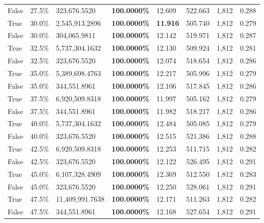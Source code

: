\begin{table}[H]
\begin{tabular}{lllrllll}
\cline{1-8}
False & 27.5\% & 323,676.5520 & \bfseries \color{red} 100.0000\% & 12.609 & 522.663 & 1,812 & 0.288 \\
\cline{1-8}
True & 30.0\% & 2,545,913.2896 & \bfseries \color{red} 100.0000\% & \bfseries \color{red} 11.916 & 505.740 & 1,812 & 0.279 \\
\cline{1-8}
False & 30.0\% & \color{red} 304,065.9811 & \bfseries \color{red} 100.0000\% & 12.142 & 519.971 & 1,812 & 0.287 \\
\cline{1-8}
True & 32.5\% & 5,737,304.1632 & \bfseries \color{red} 100.0000\% & 12.130 & 509.924 & 1,812 & 0.281 \\
\cline{1-8}
False & 32.5\% & 323,676.5520 & \bfseries \color{red} 100.0000\% & 12.074 & 518.654 & 1,812 & 0.286 \\
\cline{1-8}
True & 35.0\% & 5,389,698.4763 & \bfseries \color{red} 100.0000\% & 12.217 & 505.996 & 1,812 & 0.279 \\
\cline{1-8}
False & 35.0\% & 344,551.8961 & \bfseries \color{red} 100.0000\% & 12.106 & 517.845 & 1,812 & 0.286 \\
\cline{1-8}
True & 37.5\% & 6,920,509.8318 & \bfseries \color{red} 100.0000\% & 11.997 & 505.162 & 1,812 & 0.279 \\
\cline{1-8}
False & 37.5\% & 344,551.8961 & \bfseries \color{red} 100.0000\% & 11.982 & 518.217 & 1,812 & 0.286 \\
\cline{1-8}
True & 40.0\% & 5,737,304.1632 & \bfseries \color{red} 100.0000\% & 12.484 & 505.085 & 1,812 & 0.279 \\
\cline{1-8}
False & 40.0\% & 323,676.5520 & \bfseries \color{red} 100.0000\% & 12.515 & 521.386 & 1,812 & 0.288 \\
\cline{1-8}
True & 42.5\% & 6,920,509.8318 & \bfseries \color{red} 100.0000\% & 12.253 & 511.715 & 1,812 & 0.282 \\
\cline{1-8}
False & 42.5\% & 323,676.5520 & \bfseries \color{red} 100.0000\% & 12.122 & 526.495 & 1,812 & 0.291 \\
\cline{1-8}
True & 45.0\% & 6,107,328.4909 & \bfseries \color{red} 100.0000\% & 12.369 & 512.550 & 1,812 & 0.283 \\
\cline{1-8}
False & 45.0\% & 323,676.5520 & \bfseries \color{red} 100.0000\% & 12.250 & 528.061 & 1,812 & 0.291 \\
\cline{1-8}
True & 47.5\% & 11,409,991.7638 & \bfseries \color{red} 100.0000\% & 12.171 & 511.263 & 1,812 & 0.282 \\
\cline{1-8}
False & 47.5\% & 344,551.8961 & \bfseries \color{red} 100.0000\% & 12.168 & 527.654 & 1,812 & 0.291 \\

\end{tabular}
\end{table}
